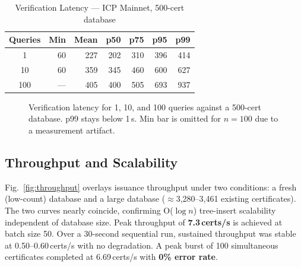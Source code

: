 \documentclass[conference]{IEEEtran}
\begin{document}
\begin{table}[t]
\caption{Verification Latency --- ICP Mainnet, 500-cert database}
\label{tab:verif}
\centering\small\renewcommand{\arraystretch}{1.1}
\begin{tabular}{@{}crrrrrr@{}}
\toprule
\textbf{Queries} & \textbf{Min} & \textbf{Mean} & \textbf{p50} & \textbf{p75} & \textbf{p95} & \textbf{p99} \\
\midrule
1   & 60  & 227 & 202 & 310 & 396 & 414 \\
10  & 60  & 359 & 345 & 460 & 600 & 627 \\
100 & {---} & 405 & 400 & 505 & 693 & 937 \\
\bottomrule
\end{tabular}
\end{table}

\begin{figure}[t]
\centering
{}
\caption{Verification latency for 1, 10, and 100 queries against a 500-cert database. p99 stays below 1\,s. Min bar is omitted for $n{=}100$ due to a measurement artifact.}
\label{fig:verif_perc}
\end{figure}

\subsection{Throughput and Scalability}
Fig.~\ref{fig:throughput} overlays issuance throughput under two conditions: a fresh (low-count) database and a large database ($\approx$3,280--3,461 existing certificates). The two curves nearly coincide, confirming O($\log n$) tree-insert scalability independent of database size. Peak throughput of \textbf{7.3\,certs/s} is achieved at batch size 50. Over a 30-second sequential run, sustained throughput was stable at 0.50--0.60\,certs/s with no degradation. A peak burst of 100 simultaneous certificates completed at 6.69\,certs/s with \textbf{0\% error rate}.
\end{document}
